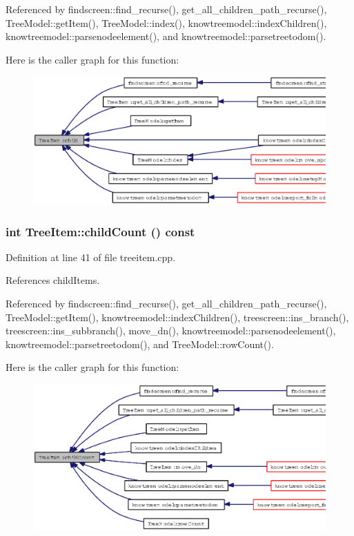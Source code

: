 Referenced by findscreen::find\_\-recurse(), get\_\-all\_\-children\_\-path\_\-recurse(), Tree\-Model::get\-Item(), Tree\-Model::index(), knowtreemodel::index\-Children(), knowtreemodel::parsenodeelement(), and knowtreemodel::parsetreetodom().

Here is the caller graph for this function:\begin{figure}[H]
\begin{center}
\leavevmode
\includegraphics[width=342pt]{classTreeItem_993f98a911be40cc1466e105b4657bbe_icgraph}
\end{center}
\end{figure}
\subsubsection{\setlength{\rightskip}{0pt plus 5cm}int Tree\-Item::child\-Count () const}\label{classTreeItem_14551ec37f50067974fc93aa78b4b6e1}




Definition at line 41 of file treeitem.cpp.

References child\-Items.

Referenced by findscreen::find\_\-recurse(), get\_\-all\_\-children\_\-path\_\-recurse(), Tree\-Model::get\-Item(), knowtreemodel::index\-Children(), treescreen::ins\_\-branch(), treescreen::ins\_\-subbranch(), move\_\-dn(), knowtreemodel::parsenodeelement(), knowtreemodel::parsetreetodom(), and Tree\-Model::row\-Count().

Here is the caller graph for this function:\begin{figure}[H]
\begin{center}
\leavevmode
\includegraphics[width=357pt]{classTreeItem_14551ec37f50067974fc93aa78b4b6e1_icgraph}
\end{center}
\end{figure}
